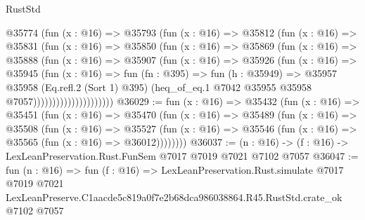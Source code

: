 \begin{lexlean}{RustStd}
\begin{coremodule}
                      @35774
                        (fun (x : @16) =>
                        @35793
                          (fun (x : @16) =>
                          @35812
                            (fun (x : @16) =>
                            @35831
                              (fun (x : @16) =>
                              @35850
                                (fun (x : @16) =>
                                @35869
                                  (fun (x : @16) =>
                                  @35888
                                    (fun (x : @16) =>
                                    @35907
                                      (fun (x : @16) =>
                                      @35926
                                        (fun (x : @16) =>
                                        @35945
                                          (fun (x : @16) =>
                                          fun (fn : @395) =>
                                          fun (h : @35949) =>
                                          @35957
                                            @35958
                                            (Eq.refl.{2} (Sort 1) @395)
                                            (heq_of_eq.{1}
                                              @7042
                                              @35955
                                              @35958
                                              @7057)))))))))))))))))))))
@36029 := fun (x : @16) =>
  @35432
    (fun (x : @16) =>
    @35451
      (fun (x : @16) =>
      @35470
        (fun (x : @16) =>
        @35489
          (fun (x : @16) =>
          @35508
            (fun (x : @16) =>
            @35527
              (fun (x : @16) => @35546 (fun (x : @16) => @35565 (fun (x : @16) => @36012))))))))
@36037 := (n : @16) -> (f : @16) -> LexLeanPreservation.Rust.FunSem @7017 @7019 @7021 @7102 @7057
@36047 := fun (n : @16) =>
  fun (f : @16) =>
  LexLeanPreservation.Rust.simulate
    @7017
    @7019
    @7021
    LexLeanPreserve.C1aacde5c819a0f7e2b68dca986038864.R45.RustStd.crate_ok
    @7102
    @7057
\end{coremodule}
\end{lexlean}
